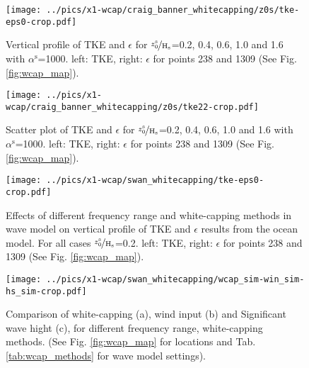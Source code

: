 \documentclass[final]{svjour3}
\begin{document}
\begin{figure}
   \centering
   \texttt{[image: ../pics/x1-wcap/craig\_banner\_whitecapping/z0s/tke-eps0-crop.pdf]} 
   \caption{Vertical profile of TKE and $\epsilon$ for
   $\nicefrac{z_0^\mathrm{s}}{\mathrm{H}_\mathrm{s}}$=0.2, 0.4, 0.6, 1.0 and 1.6
   with $\alpha^\mathrm{s}$=1000. left: TKE, right: $\epsilon$ for
   points 238 and 1309 (See Fig. \ref{fig:wcap_map}).}  
   \label{fig:z0s_compare_profile}
\end{figure}

\begin{figure}
   \centering
   \texttt{[image: ../pics/x1-wcap/craig\_banner\_whitecapping/z0s/tke22-crop.pdf]} 
   \caption{Scatter plot of TKE and $\epsilon$ for
   $\nicefrac{z_0^\mathrm{s}}{\mathrm{H}_\mathrm{s}}$=0.2, 0.4, 0.6, 1.0 and 1.6
   with $\alpha^\mathrm{s}$=1000. left: TKE, right: $\epsilon$ for
   points 238 and 1309 (See Fig. \ref{fig:wcap_map}).}  
   \label{fig:z0s_compare_scatter}
\end{figure}

\begin{figure}
   \centering
   \texttt{[image: ../pics/x1-wcap/swan\_whitecapping/tke-eps0-crop.pdf]} 
   \caption{Effects of different frequency range and white-capping methods
   in wave model on vertical profile of TKE and $\epsilon$ results from the
   ocean model.   For all cases
   $\nicefrac{z_0^\mathrm{s}}{\mathrm{H}_\mathrm{s}}$=0.2.  left:  TKE, right:
   $\epsilon$ for points 238 and 1309 (See Fig. \ref{fig:wcap_map}).} 
   \label{fig:wave_freq_range_compare_profile}
\end{figure}

\begin{figure}
   \centering
   \texttt{[image: ../pics/x1-wcap/swan\_whitecapping/wcap\_sim-win\_sim-hs\_sim-crop.pdf]} 
   \caption{Comparison of white-capping (a), wind input (b) and Significant wave
   hight (c), for different frequency range, white-capping methods. (See Fig.
   \ref{fig:wcap_map} for locations and Tab. \ref{tab:wcap_methods} for wave
   model settings).}
   \label{fig:wcap_win_wave}
\end{figure}
\end{document}
